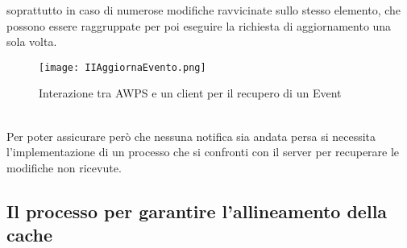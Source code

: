 soprattutto in caso di 
numerose modifiche ravvicinate sullo stesso elemento, 
che possono essere raggruppate per poi eseguire la richiesta di aggiornamento una sola volta.\\
\begin{figure}[htpb]
    \centering
    \texttt{[image: IIAggiornaEvento.png]}
    \caption{Interazione tra AWPS e un client per il recupero di un Event}
\end{figure}	
\\
Per poter assicurare però che nessuna notifica sia andata persa
si necessita l'implementazione di un processo che
si confronti con il server per recuperare le modifiche non ricevute.\\
\clearpage
\subsection{Il processo per garantire l'allineamento della cache}

